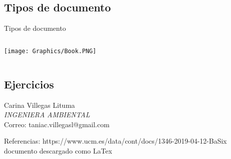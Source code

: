 \documentclass{beamer}
\begin{document}
\subsection{Tipos de documento}
\begin{frame}{Tipos de documento}
\begin{columns}
\texttt{[image: Graphics/Book.PNG]}
\vspace{2 mm}
\vspace{2 mm}
\vspace{2 mm}
\vspace{2 mm}
\vspace{2 mm}
\end{columns}
\end{frame}

\subsection{Ejercicios} 
\begin{frame}
    Carina Villegas Lituma\\
    
    \textit{INGENIERA AMBIENTAL}\\
    
    Correo: taniac.villegasl@gmail.com\\
    
\end{frame}

Referencias:
https://www.ucm.es/data/cont/docs/1346-2019-04-12-BaSix%
documento descargado como LaTex
\end{document}
